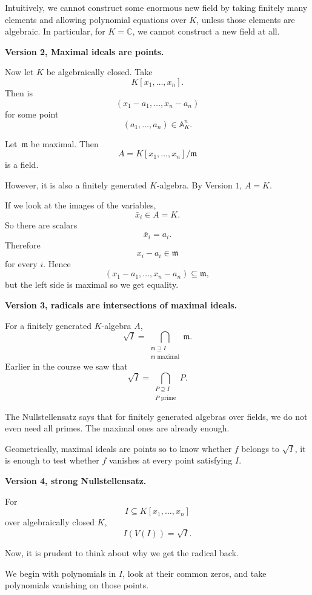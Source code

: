 \documentclass[11pt]{article}
\begin{document}
Intuitively, we cannot construct some enormous new field 
by taking finitely many elements and allowing 
polynomial equations over $K$, unless those 
elements are algebraic. 
In particular, for $K = \mathbb C$, we cannot construct a 
new field at all.

\textbf{Version 2, Maximal ideals are points.}

Now let $K$ be algebraically closed. Take 
\[
    K[x_1,\ldots,x_n]. 
\]
Then  is 
\[
    (x_1 - a_1,\ldots,x_n - a_n)
\]
for some point 
\[
    (a_1,\ldots,a_n) \in \mathbb A_K^n.
\]

Let $\mathfrak m$ be maximal. Then 
\[
    A = K[x_1,\ldots,x_n]/\mathfrak m
\]
is a field. 

However, it is also a finitely generated $K$-algebra. By 
Version $1$, $A = K$. 

If we look at the images of the variables, 
\[
    \bar x_i \in A = K. 
\]
So there are scalars 
\[
    \bar x_i = a_i.
\]
Therefore 
\[
    x_i - a_i \in \mathfrak m 
\]
for every $i$. 
Hence 
\[
    (x_1-a_1, \ldots,x_n-a_n) \subseteq \mathfrak m,
\]
but the left side is maximal so 
we get equality. 

\textbf{Version 3, radicals are intersections of maximal ideals.}

For a finitely generated $K$-algebra $A$, 
\[
    \sqrt I
    =
    \bigcap_{\substack{\mathfrak m\supseteq I\\
    \mathfrak m\text{ maximal}}}
    \mathfrak m.
\]
Earlier in the course we saw that 
\[
    \sqrt I
    =
    \bigcap_{\substack{P\supseteq I\\P\text{ prime}}}P.
\]

The Nullstellensatz says that for finitely generated 
algebras over fields, we do not even need all primes. 
The maximal ones are already enough.

Geometrically, maximal ideals are points so to know whether 
$f$ belongs to $\sqrt I$, it is enough to test whether 
$f$ vanishes at every point satisfying $I$. 

\textbf{Version 4, strong Nullstellensatz.}

For 
\[
    I \subseteq K[x_1,\ldots,x_n]
\]
over algebraically closed $K$, 
\[
    I(V(I)) = \sqrt I.
\]

Now, it is prudent to think about why we get the radical back. 

We begin with polynomials in $I$, look at their common zeros, and 
take polynomials vanishing on those points. 
\end{document}
